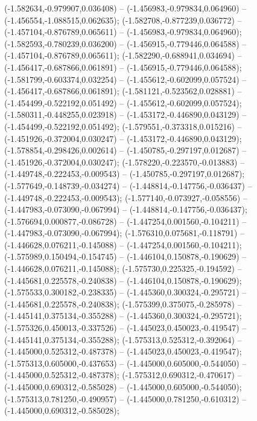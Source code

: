  (-1.582634,-0.979907,0.036408) -- (-1.456983,-0.979834,0.064960) -- (-1.456554,-1.088515,0.062635);
 (-1.582708,-0.877239,0.036772) -- (-1.457104,-0.876789,0.065611) -- (-1.456983,-0.979834,0.064960);
 (-1.582593,-0.780239,0.036200) -- (-1.456915,-0.779446,0.064588) -- (-1.457104,-0.876789,0.065611);
 (-1.582290,-0.688941,0.034694) -- (-1.456417,-0.687866,0.061891) -- (-1.456915,-0.779446,0.064588);
 (-1.581799,-0.603374,0.032254) -- (-1.455612,-0.602099,0.057524) -- (-1.456417,-0.687866,0.061891);
 (-1.581121,-0.523562,0.028881) -- (-1.454499,-0.522192,0.051492) -- (-1.455612,-0.602099,0.057524);
 (-1.580311,-0.448255,0.023918) -- (-1.453172,-0.446890,0.043129) -- (-1.454499,-0.522192,0.051492);
 (-1.579551,-0.373318,0.015216) -- (-1.451926,-0.372004,0.030247) -- (-1.453172,-0.446890,0.043129);
 (-1.578854,-0.298426,0.002614) -- (-1.450785,-0.297197,0.012687) -- (-1.451926,-0.372004,0.030247);
 (-1.578220,-0.223570,-0.013883) -- (-1.449748,-0.222453,-0.009543) -- (-1.450785,-0.297197,0.012687);
 (-1.577649,-0.148739,-0.034274) -- (-1.448814,-0.147756,-0.036437) -- (-1.449748,-0.222453,-0.009543);
 (-1.577140,-0.073927,-0.058556) -- (-1.447983,-0.073090,-0.067994) -- (-1.448814,-0.147756,-0.036437);
 (-1.576694,0.000877,-0.086728) -- (-1.447254,0.001560,-0.104211) -- (-1.447983,-0.073090,-0.067994);
 (-1.576310,0.075681,-0.118791) -- (-1.446628,0.076211,-0.145088) -- (-1.447254,0.001560,-0.104211);
 (-1.575989,0.150494,-0.154745) -- (-1.446104,0.150878,-0.190629) -- (-1.446628,0.076211,-0.145088);
 (-1.575730,0.225325,-0.194592) -- (-1.445681,0.225578,-0.240838) -- (-1.446104,0.150878,-0.190629);
 (-1.575533,0.300182,-0.238335) -- (-1.445360,0.300324,-0.295721) -- (-1.445681,0.225578,-0.240838);
 (-1.575399,0.375075,-0.285978) -- (-1.445141,0.375134,-0.355288) -- (-1.445360,0.300324,-0.295721);
 (-1.575326,0.450013,-0.337526) -- (-1.445023,0.450023,-0.419547) -- (-1.445141,0.375134,-0.355288);
 (-1.575313,0.525312,-0.392064) -- (-1.445000,0.525312,-0.487378) -- (-1.445023,0.450023,-0.419547);
 (-1.575313,0.605000,-0.437653) -- (-1.445000,0.605000,-0.544050) -- (-1.445000,0.525312,-0.487378);
 (-1.575312,0.690312,-0.470617) -- (-1.445000,0.690312,-0.585028) -- (-1.445000,0.605000,-0.544050);
 (-1.575313,0.781250,-0.490957) -- (-1.445000,0.781250,-0.610312) -- (-1.445000,0.690312,-0.585028);
